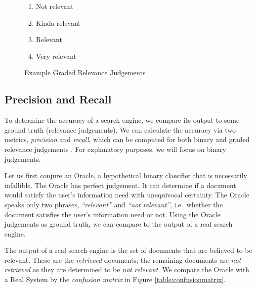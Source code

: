 \begin{figure}
    \begin{center}
        \begin{minipage}{0.25\textwidth}
            \begin{enumerate}
                \setlength\itemsep{0em}
                \item Not relevant
                \item Kinda relevant
                \item Relevant
                \item Very relevant
            \end{enumerate}
        \end{minipage}
    \end{center}
    \caption{Example Graded Relevance Judgements}
    \label{fig:graded-relevance}
\end{figure}

\subsection{Precision and Recall}

To determine the accuracy of a search engine, we compare its output to some ground truth (relevance judgements). We can calculate the accuracy via two metrics, \textit{precision} and \textit{recall}, which can be computed for both binary and graded relevance judgements \cite{kekalainen2002using}. For explanatory purposes, we will focus on binary judgements.

Let us first conjure an Oracle, a hypothetical binary classifier that is necessarily infallible. The Oracle has perfect judgement. It can determine if a document would satisfy the user's information need with unequivocal certainty. The Oracle speaks only two phrases, \textit{``relevant''} and \textit{``not relevant''}, i.e.\ whether the document satisfies the user's information need or not. Using the Oracle judgements as ground truth, we can compare to the output of a real search engine. 

The output of a real search engine is the set of documents that are believed to be relevant. These are the \textit{retrieved} documents; the remaining documents are \textit{not retrieved} as they are determined to be \textit{not relevant}. We compare the Oracle with a Real System by the \textit{confusion matrix} in Figure \ref{table:confusionmatrix}.

